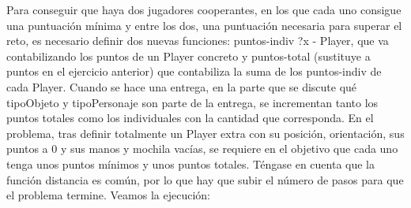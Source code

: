 Para conseguir que haya dos jugadores cooperantes, en los que cada uno consigue una puntuación mínima y entre los dos, una puntuación necesaria para superar el reto, es necesario definir dos nuevas funciones: puntos-indiv ?x - Player, que va contabilizando los puntos de un Player concreto y puntos-total (sustituye a puntos en el ejercicio anterior) que contabiliza la suma de los puntos-indiv de cada Player. Cuando se hace una entrega, en la parte que se discute qué tipoObjeto y tipoPersonaje son parte de la entrega, se incrementan tanto los puntos totales como los individuales con la cantidad que corresponda. En el problema, tras definir totalmente un Player extra con su posición, orientación, sus puntos a 0 y sus manos y mochila vacías, se requiere en el objetivo que cada uno tenga unos puntos mínimos y unos puntos totales. Téngase en cuenta que la función distancia es común, por lo que hay que subir el número de pasos para que el problema termine. Veamos la ejecución:

